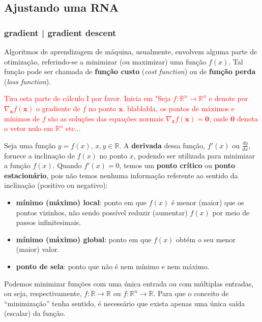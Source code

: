 \documentclass{automatextcc}
\newcommand{\pumi}[1]{\textcolor{red}{#1}}
\newcommand{\R}{\mathds{R}}
\newcommand{\bs}[1]{\boldsymbol{#1}}
\begin{document}


\subsection{Ajustando uma RNA}


\subsubsection{gradient | gradient descent}
Algoritmos de aprendizagem de máquina, usualmente, envolvem alguma parte de otimização, referindo-se a minimizar (ou maximizar) uma função $f(x)$. Tal função pode ser chamada de \textbf{função custo} (\textit{cost function}) ou de \textbf{função perda} (\textit{loss function}). 


\pumi{Tira esta parte de cálculo I por favor. Inicia em "Seja $f:\R^n\rightarrow\R^n$ e denote por $\nabla_{\bs{x}} f(\bs{x})$ o gradiente de $f$ no ponto $\bs x$. blablabla, os pontos de máximos e mínimos de $f$ são as soluções das equações normais $\nabla_{\bs{x}} f(\bs{x})=\bs0$, onde $\bs0$ denota o vetor nulo em $\R^n$ etc...}


Seja uma função $y=f(x)$, $x,y \in \R$. A \textbf{derivada} dessa função, $f'(x)$ ou $\frac{dy}{dx}$, fornece a inclinação de $f(x)$ no ponto $x$, podendo ser utilizada para minimizar a função $f(x)$. Quando $f'(x)=0$, temos um \textbf{ponto crítico} ou \textbf{ponto estacionário}, pois não temos nenhuma informação referente ao sentido da inclinação (positivo ou negativo):
\begin{itemize} %
    \item \textbf{mínimo (máximo) local}: ponto em que $f(x)$ é menor (maior) que os pontos vizinhos, não sendo possível reduzir (aumentar) $f(x)$ por meio de passos infinitesimais.
    \item \textbf{mínimo (máximo) global}: ponto em que $f(x)$ obtém o seu menor (maior) valor.
    \item \textbf{ponto de sela}: ponto que não é nem mínimo e nem máximo.
\end{itemize}
Podemos minimizar funções com uma única entrada ou com múltiplas entradas, ou seja, respectivamente, $f: \R \rightarrow \R$ ou $f: \R^n \rightarrow \R$. Para que o conceito de ``minimização'' tenha sentido, é necessário que exista apenas uma única saída (escalar) da função.
\end{document}
